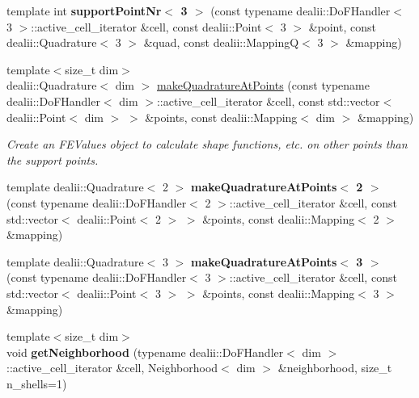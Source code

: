 \begin{DoxyCompactItemize}
\item 
\hypertarget{namespacenatrium_a597d1f2c5391e67efe48e1a8ea822bdb}{
template int {\bfseries supportPointNr$<$ 3 $>$} (const typename dealii::DoFHandler$<$ 3 $>$::active\_\-cell\_\-iterator \&cell, const dealii::Point$<$ 3 $>$ \&point, const dealii::Quadrature$<$ 3 $>$ \&quad, const dealii::MappingQ$<$ 3 $>$ \&mapping)}
\label{namespacenatrium_a597d1f2c5391e67efe48e1a8ea822bdb}

\item 
{\footnotesize template$<$size\_\-t dim$>$ }\\dealii::Quadrature$<$ dim $>$ \hyperlink{namespacenatrium_a27247bfe7bab81b738081b41113ed419}{makeQuadratureAtPoints} (const typename dealii::DoFHandler$<$ dim $>$::active\_\-cell\_\-iterator \&cell, const std::vector$<$ dealii::Point$<$ dim $>$ $>$ \&points, const dealii::Mapping$<$ dim $>$ \&mapping)
\begin{DoxyCompactList}\small\item\em Create an FEValues object to calculate shape functions, etc. on other points than the support points. \item\end{DoxyCompactList}\item 
\hypertarget{namespacenatrium_ac8fb2d7fb073970c20ac95c08e79283f}{
template dealii::Quadrature$<$ 2 $>$ {\bfseries makeQuadratureAtPoints$<$ 2 $>$} (const typename dealii::DoFHandler$<$ 2 $>$::active\_\-cell\_\-iterator \&cell, const std::vector$<$ dealii::Point$<$ 2 $>$ $>$ \&points, const dealii::Mapping$<$ 2 $>$ \&mapping)}
\label{namespacenatrium_ac8fb2d7fb073970c20ac95c08e79283f}

\item 
\hypertarget{namespacenatrium_a1cc55ab3e7c6c6eca599770406beac5a}{
template dealii::Quadrature$<$ 3 $>$ {\bfseries makeQuadratureAtPoints$<$ 3 $>$} (const typename dealii::DoFHandler$<$ 3 $>$::active\_\-cell\_\-iterator \&cell, const std::vector$<$ dealii::Point$<$ 3 $>$ $>$ \&points, const dealii::Mapping$<$ 3 $>$ \&mapping)}
\label{namespacenatrium_a1cc55ab3e7c6c6eca599770406beac5a}

\item 
\hypertarget{namespacenatrium_a739b95319a61aa10dd39b2c1e2cd79e7}{
{\footnotesize template$<$size\_\-t dim$>$ }\\void {\bfseries getNeighborhood} (typename dealii::DoFHandler$<$ dim $>$::active\_\-cell\_\-iterator \&cell, Neighborhood$<$ dim $>$ \&neighborhood, size\_\-t n\_\-shells=1)}
\label{namespacenatrium_a739b95319a61aa10dd39b2c1e2cd79e7}


\end{DoxyCompactItemize}
